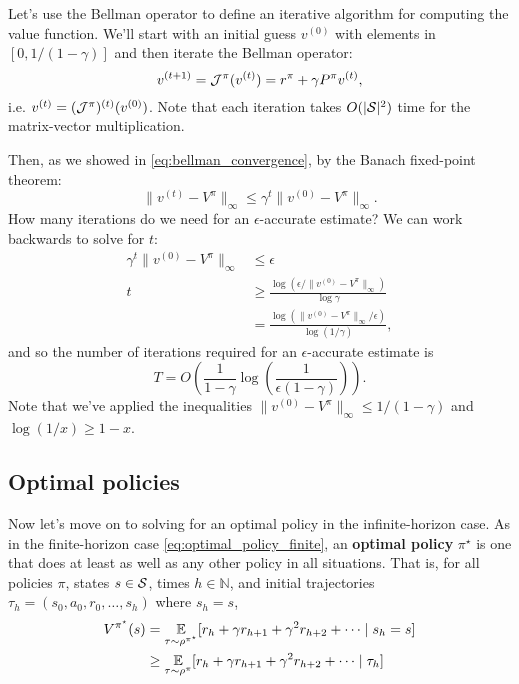 \documentclass[\main/main]{subfiles}
\begin{document}
Let's use the Bellman operator to define an iterative algorithm for computing the value function. We'll start with an initial guess $v^{(0)}$ with elements in $[0, 1/(1-\gamma)]$ and then iterate the Bellman operator:
\[
    v^{(t+1)} = \bop^{\pi}(v^{(t)}) = r^{\pi} + \gamma P^{\pi} v^{(t)},
\]
i.e. $v^{(t)} = (\bop^{\pi})^{(t)} (v^{(0)})$. Note that each iteration takes $O(|\S|^2)$ time for the matrix-vector multiplication.

Then, as we showed in \eqref{eq:bellman_convergence}, by the Banach fixed-point theorem:
\[
    \|v^{(t)} - V^\pi \|_{\infty} \le \gamma^{t} \| v^{(0)} - V^\pi\|_{\infty}.
\]
How many iterations do we need for an $\epsilon$-accurate estimate? We can work backwards to solve for $t$:
\begin{align*}
    \gamma^t \|v^{(0)} - V^\pi\|_{\infty} &\le \epsilon \\
    t &\ge \frac{\log (\epsilon / \|v^{(0)} - V^\pi\|_{\infty})}{\log \gamma} \\
    &= \frac{\log (\|v^{(0)} - V^\pi\|_{\infty} / \epsilon)}{\log (1 / \gamma)},
\end{align*}
and so the number of iterations required for an $\epsilon$-accurate estimate is
\begin{equation}
    T = O\left( \frac{1}{1-\gamma} \log\left(\frac{1}{\epsilon (1-\gamma)}\right) \right). \label{eq:iterations_vi}
\end{equation}
Note that we've applied the inequalities $\|v^{(0)} - V^\pi\|_{\infty} \le 1/(1-\gamma)$ and $\log (1/x) \ge 1-x$.

\subsection{Optimal policies}

Now let's move on to solving for an optimal policy in the infinite-horizon case. As in the finite-horizon case \eqref{eq:optimal_policy_finite}, an \textbf{optimal policy} $\pi^\star$ is one that does at least as well as any other policy in all situations. That is, for all policies $\pi$, states $s \in \S$, times $h \in \mathbb{N}$, and initial trajectories $\tau_h = (s_0, a_0, r_0, \dots, s_h)$ where $s_h = s$,
\begin{equation}
    \begin{aligned}
        V^{\pi^\star}(s) &= \E_{\tau \sim \rho^{\pi^{\star}}}[r_h + \gamma r_{h+1} + \gamma^2 r_{h+2}  + \cdots \mid s_h = s] \\
        &\ge \E_{\tau \sim \rho^{\pi}}[r_h + \gamma r_{h+1} + \gamma^2 r_{h+2} + \cdots \mid \tau_h]
    \end{aligned}
    \label{eq:optimal_policy_infinite}
\end{equation}
\end{document}
